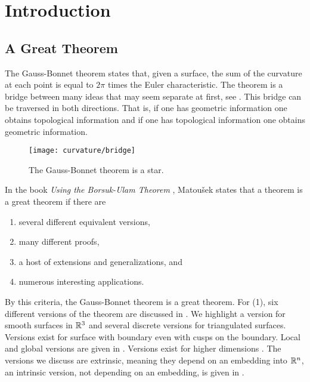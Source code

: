 \section{Introduction}
\label{sec:intro}

\subsection{A Great Theorem}
The Gauss-Bonnet theorem states that, given a surface, the sum of the curvature
at each point is equal to $2\pi$ times the Euler characteristic.
The theorem is a bridge between many ideas that may
seem separate at first, see . 
This bridge can be traversed in both directions.
That is, if one has geometric information one obtains topological information and
if one has topological information one obtains geometric information.


\begin{figure}[htb]
\centering
\texttt{[image: curvature/bridge]}
\caption{The Gauss-Bonnet theorem is a star.}
\label{fig:bridge}
\end{figure}

In the book \emph{Using the Borsuk-Ulam Theorem}
\cite{jm08},
Matou\v{s}ek states that a theorem is a great theorem if there are
\begin{enumerate}[(1)]
\item several different equivalent versions,
\item many different proofs,
\item a host of extensions and generalizations, and
\item numerous interesting applications.
\end{enumerate}

By this criteria, the Gauss-Bonnet theorem is a great theorem.
For (1), six different versions of the theorem are discussed
in \cite{wu_historical_2008}. 
We highlight a version for smooth surfaces in $\mathbb{R}^3$ and
 several discrete versions for triangulated surfaces. 
 Versions exist for surface with boundary even with cusps on
 the boundary.
 Local and global versions are given in \cite{doc76}.
Versions exist for higher dimensions \cite{guillemin_differential_2010}.
The versions we discuss are extrinsic, meaning they depend on an embedding
into $\mathbb{R}^n$, an intrinsic version, not depending on an embedding,
 is given in \cite{chern_simple_1944}.
 
